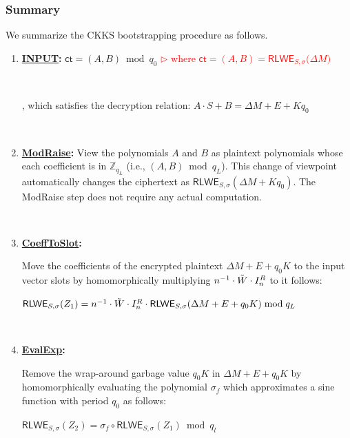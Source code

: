 \subsubsection{Summary}
\label{subsubsec:ckks-bootstrapping-summary}

We summarize the CKKS bootstrapping procedure as follows. 

\begin{tcolorbox}[title={\textbf{\tboxlabel{\ref*{subsubsec:ckks-bootstrapping-summary}} CKKS Bootstrapping}}]

\begin{enumerate}
\item \textsf{\textbf{\underline{INPUT}:}} $\textsf{ct} = (A, B) \bmod q_0$ \textcolor{red}{ $\rhd$ where $\textsf{ct}=(A, B) = \textsf{RLWE}_{S, \sigma}\bm(\Delta M \bm)$}

$ $

, which satisfies the decryption relation: $A\cdot S + B = \Delta M + E + Kq_0$ 

$ $

\item \textsf{\textbf{\underline{ModRaise}:}} View the polynomials $A$ and $B$ as plaintext polynomials whose each coefficient is in $\mathbb{Z}_{q_L}$ (i.e., $(A, B) \bmod q_L$). This change of viewpoint automatically changes the ciphertext as $\textsf{RLWE}_{S, \sigma}(\Delta M + Kq_0)$. The \textsf{ModRaise} step does not require any actual computation. 

$ $

\item \textsf{\textbf{\underline{CoeffToSlot}:}} 

Move the coefficients of the encrypted plaintext $\Delta M + E + q_0K$ to the input vector slots by homomorphically multiplying $n^{-1}\cdot \tilde W \cdot I_n^R$ to it follows: 

$\textsf{RLWE}_{S, \sigma}(Z_1) = n^{-1}\cdot \tilde W \cdot I_n^R \cdot \textsf{RLWE}_{S, \sigma}(\Delta M + E + q_0K) \bmod q_L$

$ $

\item \textsf{\textbf{\underline{EvalExp}:}} 

Remove the wrap-around garbage value $q_0K$ in $\Delta M + E + q_0K$ by homomorphically evaluating the polynomial $\sigma_f$ which approximates a sine function with period $q_0$ as follows: 

$\textsf{RLWE}_{S, \sigma}(Z_2) = \sigma_f \circ \textsf{RLWE}_{S, \sigma}(Z_1)  \bmod q_l$


\end{enumerate}
\end{tcolorbox}
